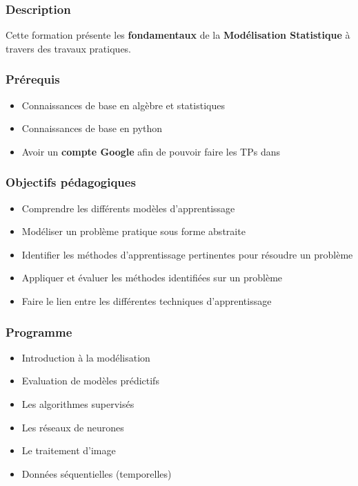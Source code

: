 
\begin{frame}
  \frametitle{Description}
  Cette formation présente les \textbf{fondamentaux} de la \textbf{Modélisation Statistique} à travers des travaux pratiques. \\
\end{frame}

\begin{frame}
  \frametitle{Prérequis}
  \begin{itemize}
  \item Connaissances de base en algèbre et statistiques
  \item Connaissances de base en python
  \item Avoir un \textbf{compte Google} afin de pouvoir faire les TPs dans 
  \end{itemize}
\end{frame}

\begin{frame}
  \frametitle{Objectifs pédagogiques}
  \begin{itemize}
  \item Comprendre les différents modèles d'apprentissage
  \item Modéliser un problème pratique sous forme abstraite
  \item Identifier les méthodes d'apprentissage pertinentes pour résoudre un problème
  \item Appliquer et évaluer les méthodes identifiées sur un problème
  \item Faire le lien entre les différentes techniques d'apprentissage
  \end{itemize}
\end{frame}

\begin{frame}
  \frametitle{Programme}
  \begin{itemize}
  \item Introduction à la modélisation
  \item Evaluation de modèles prédictifs
  \item Les algorithmes supervisés
  \item Les réseaux de neurones
  \item Le traitement d'image
  \item Données séquentielles (temporelles)
  \end{itemize}
\end{frame}

